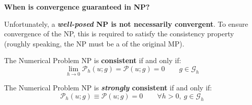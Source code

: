 \newpage

\begin{flushleft}
    \textcolor{Green3}{ \textbf{When is convergence guaranteed in NP?}}
\end{flushleft}
Unfortunately, a \textbf{\emph{well-posed} NP is not necessarily convergent}. To ensure convergence of the NP, this is required to satisfy the consistency property (roughly speaking, the NP must be a  of the original MP).

\highspace
\begin{definitionbox}
    The Numerical Problem NP is \textbf{consistent} if and only if:
    \begin{equation*}
        \lim\limits_{h \rightarrow 0}\mathcal{P}_{h}\left(u; g\right) = \mathcal{P}\left(u;g\right) = 0 \hspace{2em} g \in \mathcal{G}_{h}
    \end{equation*}

    The Numerical Problem NP is \textbf{\emph{strongly} consistent} if and only if:
    \begin{equation*}
        \mathcal{P}_{h}\left(u; g\right) \equiv \mathcal{P}\left(u;g\right) = 0 \hspace{2em} \forall h > 0, \: g \in \mathcal{G}_{h}
    \end{equation*}
\end{definitionbox}

